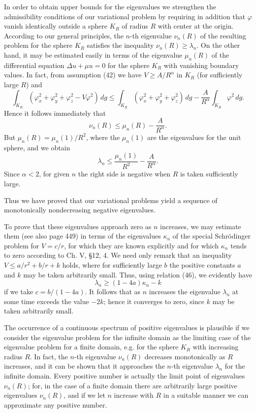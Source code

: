 In order to obtain upper bounds for the eigenvalues we strengthen the admissibility conditions of our variational problem by requiring in addition that $\varphi$ vanish identically outside a sphere $K_R$ of radius $R$ with center at the origin. According to our general principles, the $n$-th eigenvalue $\nu_n(R)$ of the resulting problem for the sphere $K_R$ satisfies the inequality $\nu_n(R)\ge\lambda_n$. On the other hand, it may be estimated easily in terms of the eigenvalue $\mu_n(R)$ of the differential equation $\Delta u+\mu u=0$ for the sphere $K_R$ with vanishing boundary values. In fact, from assumption (42) we have $V\ge A/R^\alpha$ in $K_R$ (for sufficiently large $R$) and
\[
\int_{K_R}(\varphi_x^2+\varphi_y^2+\varphi_z^2-V\varphi^2)\,dg
\le\int_{K_R}(\varphi_x^2+\varphi_y^2+\varphi_z^2)\,dg
-\frac A{R^\alpha}\int_{K_R}\varphi^2\,dg.
\]
Hence it follows immediately that
\[
\nu_n(R)\le\mu_n(R)-\frac A{R^\alpha}.
\]
But $\mu_n(R)=\mu_n(1)/R^2$, where the $\mu_n(1)$ are the eigenvalues for the unit sphere, and we obtain
\[
\lambda_n\le\frac{\mu_n(1)}{R^2}-\frac A{R^\alpha}.
\]
Since $\alpha<2$, for given $n$ the right side is negative when $R$ is taken sufficiently large.

Thus we have proved that our variational problems yield a sequence of monotonically nondecreasing negative eigenvalues.

To prove that these eigenvalues approach zero as $n$ increases, we may estimate them (see also page 449) in terms of the eigenvalues $\kappa_n$ of the special Schrödinger problem for $V=c/r$, for which they are known explicitly and for which $\kappa_n$ tends to zero according to Ch. V, \S12, 4. We need only remark that an inequality $V\le a/r^2+b/r+k$ holds, where for sufficiently large $b$ the positive constants $a$ and $k$ may be taken arbitrarily small. Thus, using relation (46), we evidently have
\[
\lambda_n\ge(1-4a)\kappa_n-k
\]
if we take $c=b/(1-4a)$. It follows that as $n$ increases the eigenvalue $\lambda_n$ at some time exceeds the value $-2k$; hence it converges to zero, since $k$ may be taken arbitrarily small.

The occurrence of a continuous spectrum of positive eigenvalues is plausible if we consider the eigenvalue problem for the infinite domain as the limiting case of the eigenvalue problem for a finite domain, e.g. for the sphere $K_R$ with increasing radius $R$. In fact, the $n$-th eigenvalue $\nu_n(R)$ decreases monotonically as $R$ increases, and it can be shown that it approaches the $n$-th eigenvalue $\lambda_n$ for the infinite domain. Every positive number is actually the limit point of eigenvalues $\nu_n(R)$; for, in the case of a finite domain there are arbitrarily large positive eigenvalues $\nu_n(R)$, and if we let $n$ increase with $R$ in a suitable manner we can approximate any positive number.


